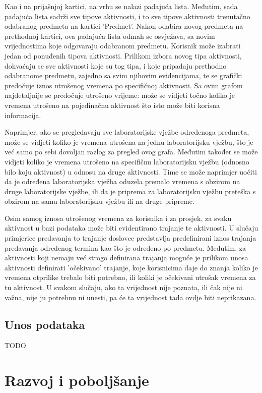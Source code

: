 \documentclass[times, utf8, zavrsni, numeric]{fer}
\begin{document}
Kao i na prijašnjoj kartici, na vrhu se nalazi padajuća lista. Međutim, sada padajuća lista sadrži sve tipove aktivnosti, i to sve tipove aktivnosti trenutačno odabranog predmeta na kartici 'Predmet'. Nakon odabira novog predmeta na prethodnoj kartici, ova padajuća lista odmah se osvježava, sa novim vrijednostima koje odgovaraju odabranom predmetu. Korisnik može izabrati jedan od ponuđenih tipova aktivnosti. Prilikom izbora novog tipa aktivnosti, dohvaćaju se sve aktivnosti koje su tog tipa, i koje pripadaju prethodno odabranome predmetu, zajedno sa svim njihovim evidencijama, te se grafički predočuje iznos utrošenog vremena po specifičnoj aktivnosti. Sa ovim grafom najdetaljnije se predočuje utrošeno vrijeme: može se vidjeti točno koliko je vremena utrošeno na pojedinačnu aktivnost što isto može biti korisna informacija.

Naprimjer, ako se pregledavaju sve laboratorijske vježbe određenoga predmeta, može se vidjeti koliko je vremena utrošena na jednu laboratorijsku vježbu, što je već samo po sebi dovoljan razlog za pregled ovog grafa. Međutim također se može vidjeti koliko je vremena utrošeno na specifičnu laboratorijsku vježbu (odnosno bilo koju aktivnost) u odnosu na druge aktivnosti. Time se može naprimjer uočiti da je određena laboratorijska vježba oduzela premalo vremena s obzirom na druge laboratorijske vježbe, ili da je priprema za laboratorijsku vježbu preteška s obzirom na samu laboratorijsku vježbu ili na druge pripreme.

Osim samog iznosa utrošenog vremena za korisnika i za prosjek, za svaku aktivnost u bazi podataka može biti evidentirano trajanje te aktivnosti. U slučaju primjerice predavanja to trajanje doslovce predstavlja predefinirani iznos trajanja predavanja određenog termina kao što je određeno po predmetu. Međutim, za aktivnosti koji nemaju već strogo definirana trajanja moguće je prilikom unosa aktivnosti definirati 'očekivano' trajanje, koje korisnicima daje do znanja koliko je vremena otprilike trebalo biti potrebno, ili koliki je očekivani utrošak vremena za tu aktivnost. U svakom slučaju, ako ta vrijednost nije poznata, ili čak nije ni važna, nije ju potrebnu ni unesti, pa će ta vrijednost tada ovdje biti neprikazana.

\subsection{Unos podataka}

TODO

\section{Razvoj i poboljšanje}
\end{document}
